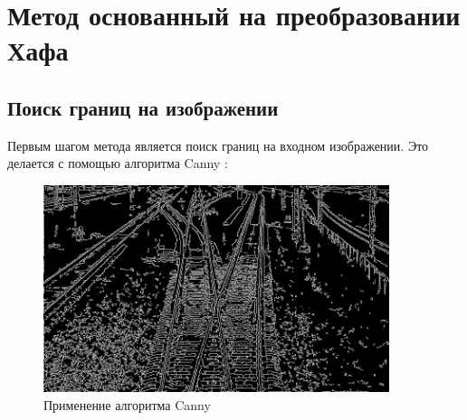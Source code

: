 \section{Метод основанный на преобразовании Хафа}
\label{houghAlgo}
\subsection{Поиск границ на изображении}
Первым шагом метода является поиск границ на входном изображении. Это делается с помощью алгоритма Canny \cite{b:canny}:
\begin{figure}[!h]
	\centering
	\includegraphics[width=0.9\textwidth]{pictures/canny_res}
	\caption[Применение алгоритма Canny]{Применение алгоритма Canny}
	\label{fig:cannyres}
\end{figure}

